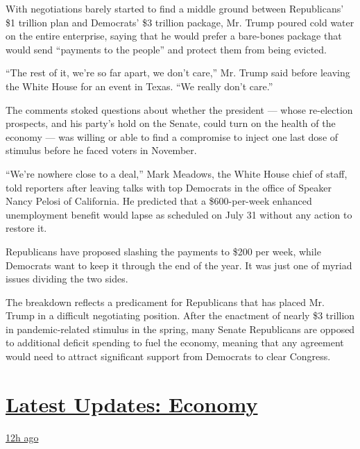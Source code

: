 With negotiations barely started to find a middle ground between
Republicans' \$1 trillion plan and Democrats' \$3 trillion package, Mr.
Trump poured cold water on the entire enterprise, saying that he would
prefer a bare-bones package that would send ``payments to the people''
and protect them from being evicted.

``The rest of it, we're so far apart, we don't care,'' Mr. Trump said
before leaving the White House for an event in Texas. ``We really don't
care.''

The comments stoked questions about whether the president --- whose
re-election prospects, and his party's hold on the Senate, could turn on
the health of the economy --- was willing or able to find a compromise
to inject one last dose of stimulus before he faced voters in November.

``We're nowhere close to a deal,'' Mark Meadows, the White House chief
of staff, told reporters after leaving talks with top Democrats in the
office of Speaker Nancy Pelosi of California. He predicted that a
\$600-per-week enhanced unemployment benefit would lapse as scheduled on
July 31 without any action to restore it.

Republicans have proposed slashing the payments to \$200 per week, while
Democrats want to keep it through the end of the year. It was just one
of myriad issues dividing the two sides.

The breakdown reflects a predicament for Republicans that has placed Mr.
Trump in a difficult negotiating position. After the enactment of nearly
\$3 trillion in pandemic-related stimulus in the spring, many Senate
Republicans are opposed to additional deficit spending to fuel the
economy, meaning that any agreement would need to attract significant
support from Democrats to clear Congress.

\hypertarget{latest-updates-economy}{%
\section{\texorpdfstring{\href{https://www.nytimes.com/live/2020/08/03/business/stock-market-today-coronavirus?action=click\&pgtype=Article\&state=default\&region=MAIN_CONTENT_1\&context=storylines_live_updates}{Latest
Updates:
Economy}}{Latest Updates: Economy}}\label{latest-updates-economy}}

\href{https://www.nytimes.com/live/2020/08/03/business/stock-market-today-coronavirus?action=click\&pgtype=Article\&state=default\&region=MAIN_CONTENT_1\&context=storylines_live_updates\#the-chicago-fed-president-says-its-up-to-congress-to-save-the-economy}{12h
ago}

